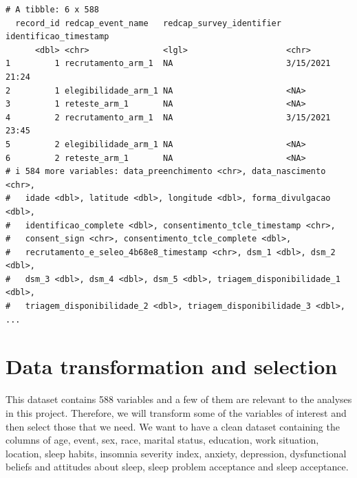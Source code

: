 \documentclass[
  letterpaper,
  DIV=11,
  numbers=noendperiod]{scrreprt}
\begin{document}
\begin{verbatim}
# A tibble: 6 x 588
  record_id redcap_event_name   redcap_survey_identifier identificao_timestamp
      <dbl> <chr>               <lgl>                    <chr>                
1         1 recrutamento_arm_1  NA                       3/15/2021 21:24      
2         1 elegibilidade_arm_1 NA                       <NA>                 
3         1 reteste_arm_1       NA                       <NA>                 
4         2 recrutamento_arm_1  NA                       3/15/2021 23:45      
5         2 elegibilidade_arm_1 NA                       <NA>                 
6         2 reteste_arm_1       NA                       <NA>                 
# i 584 more variables: data_preenchimento <chr>, data_nascimento <chr>,
#   idade <dbl>, latitude <dbl>, longitude <dbl>, forma_divulgacao <dbl>,
#   identificao_complete <dbl>, consentimento_tcle_timestamp <chr>,
#   consent_sign <chr>, consentimento_tcle_complete <dbl>,
#   recrutamento_e_seleo_4b68e8_timestamp <chr>, dsm_1 <dbl>, dsm_2 <dbl>,
#   dsm_3 <dbl>, dsm_4 <dbl>, dsm_5 <dbl>, triagem_disponibilidade_1 <dbl>,
#   triagem_disponibilidade_2 <dbl>, triagem_disponibilidade_3 <dbl>, ...
\end{verbatim}

\hypertarget{data-transformation-and-selection}{%
\section{Data transformation and
selection}\label{data-transformation-and-selection}}

This dataset contains 588 variables and a few of them are relevant to
the analyses in this project. Therefore, we will transform some of the
variables of interest and then select those that we need. We want to
have a clean dataset containing the columns of age, event, sex, race,
marital status, education, work situation, location, sleep habits,
insomnia severity index, anxiety, depression, dysfunctional beliefs and
attitudes about sleep, sleep problem acceptance and sleep acceptance.
\end{document}
